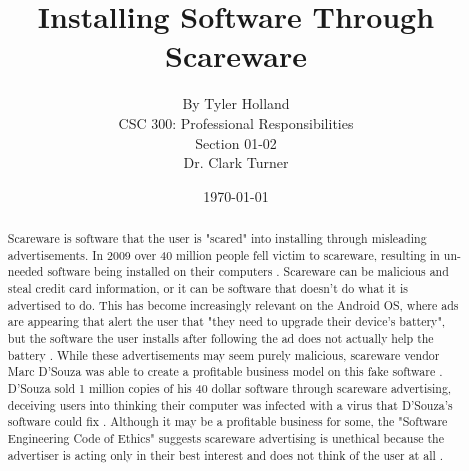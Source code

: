 \documentclass[11pt]{article}
\begin{document}
\title{\vfill Installing Software Through Scareware} %
\author{
By Tyler Holland \vspace{10pt} \\
CSC 300: Professional Responsibilities  \vspace{10pt} \\
Section 01-02 \vspace{10pt} \\
Dr. Clark Turner \vspace{10pt} \\
}
\date {\today} %

\maketitle

\vfill  %
\begin{abstract}
Scareware is software that the user is "scared" into installing through misleading advertisements. In 2009 over 40 million people fell victim to scareware, resulting in un-needed software being installed on their computers \cite{bbcmillionstricked}. Scareware can be malicious and steal credit card information, or it can be software that doesn't do what it is advertised to do. This has become increasingly relevant on the Android OS, where ads are appearing that alert the user that "they need to upgrade their device's battery", but the software the user installs after following the ad does not actually help the battery \cite{pcworldandroid}. While these advertisements may seem purely malicious, scareware vendor Marc D'Souza was able to create a profitable business model on this fake software \cite{pcworld8.2million}. D'Souza sold 1 million copies of his 40 dollar software through scareware advertising, deceiving users into thinking their computer was infected with a virus that D'Souza's software could fix \cite{pcworld8.2million}. Although it may be a profitable business for some, the "Software Engineering Code of Ethics" suggests scareware advertising is unethical because the advertiser is acting only in their best interest and does not think of the user at all \cite{secode}.
\end{abstract}

\thispagestyle{empty} %
\newpage

\thispagestyle{empty}  %
\tableofcontents
\end{document}
